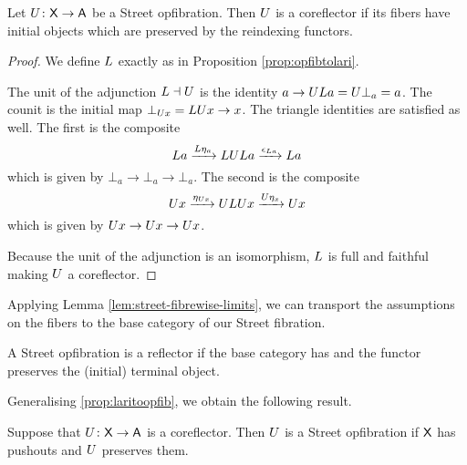 \documentclass{amsart}
\begin{document}
\begin{prop} \label{thm:street-opfib-to-corefl}
  Let $ U \colon \mathsf{X} \to \mathsf{A} $ be a Street opfibration. Then $ U $ is a coreflector if its fibers have initial objects which are preserved by the reindexing functors.
\end{prop}

\begin{proof}
  We define $ L $ exactly as in Proposition
  \ref{prop:opfibtolari}. 

  The unit of the adjunction $ L \dashv U $ is the
  identity $ a\to UL a = U\bot_a = a $.  The
  counit is the initial map $ \bot_{U x} = LU x \to
  x $.  The triangle identities are satisfied as
  well. The first is the composite
  \[
    L a
    \xrightarrow{L\eta_a}        LUL a
    \xrightarrow{\epsilon_{L a}} L a
  \]
  which is given by $ \bot_a \to \bot_a \to \bot_a
  $.  The second is the composite
  \[
    U x
    \xrightarrow{\eta_{U x}} ULU x
    \xrightarrow{U\eta_x}    U x
  \]
  which is given by $ U x \to U x \to U x $.

  Because the unit of the adjunction is an
  isomorphism, $ L $ is full and faithful
  \cite[{Prop.~1.3}]{gabrielzisman} making $ U $ a
  coreflector.
\end{proof}

Applying Lemma \ref{lem:street-fibrewise-limits}, we can
transport the assumptions on the fibers to the base category
of our Street fibration.

\begin{cor}
  A Street opfibration is a reflector if the base
  category has and the functor preserves the (initial)
  terminal object.
\end{cor}

Generalising \cref{prop:laritoopfib}, we obtain the following result.

\begin{prop}
  \label{thm:corefl-to-street-opfib}
  Suppose that $ U \colon \mathsf{X} \to \mathsf{A} $ is a
  coreflector. Then $ U $ is a Street opfibration
  if $ \mathsf{X} $ has pushouts and $ U $ preserves them.
\end{prop}
\end{document}
